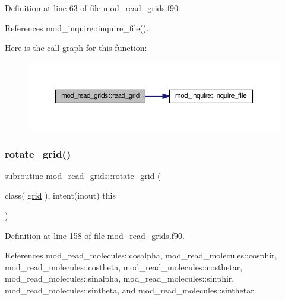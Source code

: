 Definition at line 63 of file mod\+\_\+read\+\_\+grids.\+f90.



References mod\+\_\+inquire\+::inquire\+\_\+file().

Here is the call graph for this function\+:
\nopagebreak
\begin{figure}[H]
\begin{center}
\leavevmode
\includegraphics[width=350pt]{namespacemod__read__grids_aef0317c21ab86e2e970824fb37f613e7_cgraph}
\end{center}
\end{figure}
\mbox{\label{namespacemod__read__grids_a8da3c9d08e5085b9badea630f01b0666}} 
\subsubsection{\texorpdfstring{rotate\+\_\+grid()}{rotate\_grid()}}
{\footnotesize\ttfamily subroutine mod\+\_\+read\+\_\+grids\+::rotate\+\_\+grid (\begin{DoxyParamCaption}\item[{class( \hyperlink{structmod__read__grids_1_1grid}{grid} ), intent(inout)}]{this }\end{DoxyParamCaption})}



Definition at line 158 of file mod\+\_\+read\+\_\+grids.\+f90.



References mod\+\_\+read\+\_\+molecules\+::cosalpha, mod\+\_\+read\+\_\+molecules\+::cosphir, mod\+\_\+read\+\_\+molecules\+::costheta, mod\+\_\+read\+\_\+molecules\+::costhetar, mod\+\_\+read\+\_\+molecules\+::sinalpha, mod\+\_\+read\+\_\+molecules\+::sinphir, mod\+\_\+read\+\_\+molecules\+::sintheta, and mod\+\_\+read\+\_\+molecules\+::sinthetar.

\mbox{\label{namespacemod__read__grids_ac22d113a654f79569a6fe3d747c7676e}} 
